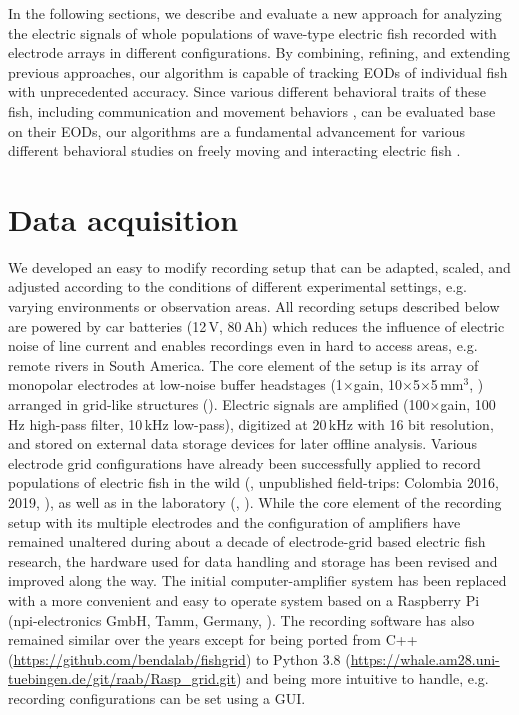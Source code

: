 In the following sections, we describe and evaluate a new approach for analyzing the electric signals of whole populations of wave-type electric fish recorded with electrode arrays in different configurations. By combining, refining, and extending previous approaches, our algorithm is capable of tracking EODs of individual fish with unprecedented accuracy. Since various different behavioral traits of these fish, including communication \citep{Smith2013} and movement behaviors \citep{Madhav2018}, can be evaluated base on their EODs, our algorithms are a fundamental advancement for various different behavioral studies on freely moving and interacting electric fish \citep{Raab2019, Raab2021}.

\section{Data acquisition}

We developed an easy to modify recording setup that can be adapted, scaled, and adjusted according to the conditions of different experimental settings, e.g. varying environments or observation areas. All recording setups described below are powered by car batteries (12\,V, 80\,Ah) which reduces the influence of electric noise of line current and enables recordings even in hard to access areas, e.g. remote rivers in South America. The core element of the setup is its array of monopolar electrodes at low-noise buffer headstages (1$\times$gain, 10$\times$5$\times$5\,mm$^3$, ) arranged in grid-like structures (). Electric signals are amplified (100$\times$gain, 100\,Hz high-pass filter, 10\,kHz low-pass), digitized at 20\,kHz with 16 bit resolution, and stored on external data storage devices for later offline analysis. Various electrode grid configurations have already been successfully applied to record populations of electric fish in the wild (\citealp{Henninger2018, Henninger2020}, unpublished field-trips: Colombia 2016, 2019, ), as well as in the laboratory (\citealp{Raab2019, Raab2021}, ). While the core element of the recording setup with its multiple electrodes and the configuration of amplifiers have remained unaltered during about a decade of electrode-grid based electric fish research, the hardware used for data handling and storage has been revised and improved along the way. The initial computer-amplifier system has been replaced with a more convenient and easy to operate system based on a Raspberry Pi (npi-electronics GmbH, Tamm, Germany, ). The recording software has also remained similar over the years except for being ported from C++ (\url{https://github.com/bendalab/fishgrid}) to Python 3.8 (\url{https://whale.am28.uni-tuebingen.de/git/raab/Rasp_grid.git}) and being more intuitive to handle, e.g. recording configurations can be set using a GUI.

